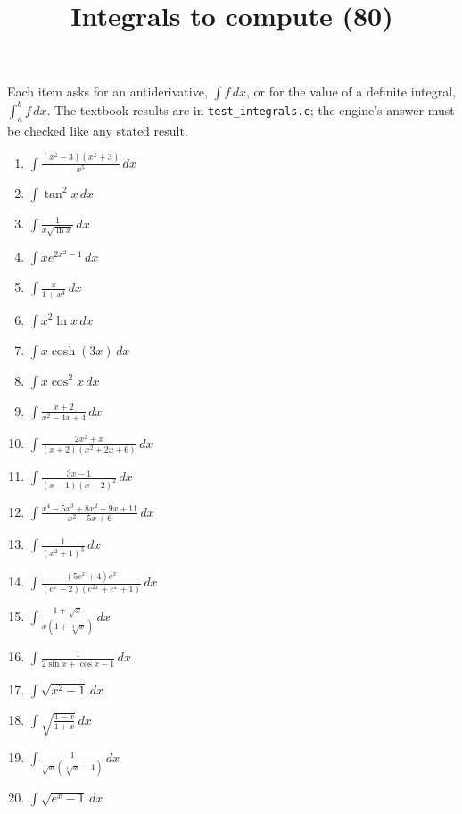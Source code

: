 \documentclass[11pt,a4paper]{article}
\title{Integrals to compute (80)}
\author{}
\date{}
\begin{document}
\maketitle
Each item asks for an antiderivative, $\int f \, dx$, or for the value of a definite integral, $\int_{a}^{b} f \, dx$. The textbook results are in \texttt{test\_integrals.c}; the engine's answer must be checked like any stated result.

\begin{enumerate}
\item $\displaystyle \int \frac{\left(x^{2} - 3\right)\left(x^{2} + 3\right)}{x^{5}} \, dx$
\item $\displaystyle \int \tan^{2} x \, dx$
\item $\displaystyle \int \frac{1}{x\sqrt{\ln x}} \, dx$
\item $\displaystyle \int x e^{2x^{2} - 1} \, dx$
\item $\displaystyle \int \frac{x}{1 + x^{4}} \, dx$
\item $\displaystyle \int x^{2}\ln x \, dx$
\item $\displaystyle \int x\cosh\left(3x\right) \, dx$
\item $\displaystyle \int x\cos^{2} x \, dx$
\item $\displaystyle \int \frac{x + 2}{x^{2} - 4x + 4} \, dx$
\item $\displaystyle \int \frac{2x^{2} + x}{(x + 2)\left(x^{2} + 2x + 6\right)} \, dx$
\item $\displaystyle \int \frac{3x - 1}{(x - 1)(x - 2)^{2}} \, dx$
\item $\displaystyle \int \frac{x^{4} - 5x^{3} + 8x^{2} - 9x + 11}{x^{2} - 5x + 6} \, dx$
\item $\displaystyle \int \frac{1}{\left(x^{2} + 1\right)^{3}} \, dx$
\item $\displaystyle \int \frac{\left(5e^{x} + 4\right)e^{x}}{\left(e^{x} - 2\right)\left(e^{2x} + e^{x} + 1\right)} \, dx$
\item $\displaystyle \int \frac{1 + \sqrt{x}}{x\left(1 + \sqrt[3]{x}\right)} \, dx$
\item $\displaystyle \int \frac{1}{2\sin x + \cos x - 1} \, dx$
\item $\displaystyle \int \sqrt{x^{2} - 1} \, dx$
\item $\displaystyle \int \sqrt{\frac{1 - x}{1 + x}} \, dx$
\item $\displaystyle \int \frac{1}{\sqrt{x}\left(\sqrt[4]{x} - 1\right)} \, dx$
\item $\displaystyle \int \sqrt{e^{x} - 1} \, dx$

\end{enumerate}
\end{document}
